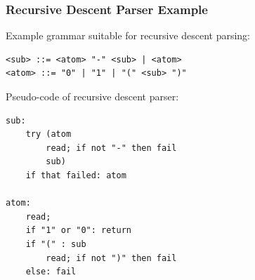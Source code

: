\documentclass[12pt]{article}
\begin{document}
\subsubsection{Recursive Descent Parser Example}

Example grammar suitable for recursive descent parsing:

\begin{lstlisting}
<sub> ::= <atom> "-" <sub> | <atom>
<atom> ::= "0" | "1" | "(" <sub> ")"
\end{lstlisting}

Pseudo-code of recursive descent parser:

\begin{lstlisting}
sub:
	try (atom
		read; if not "-" then fail
		sub)
	if that failed: atom
	
atom:
	read;
	if "1" or "0": return
	if "(" : sub
		read; if not ")" then fail
	else: fail
\end{lstlisting}
\end{document}
